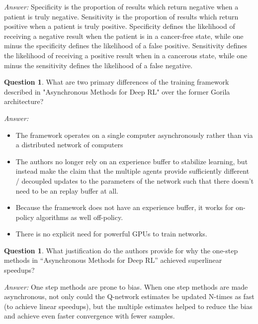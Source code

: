 \documentclass{article}
\theoremstyle{definition}
\newtheorem{question}[thm]{Question}
\newenvironment{answer}{\noindent\textit{Answer:}}{}
\begin{document}
\begin{answer}
Specificity is the proportion of results which return negative when a patient is truly negative. Sensitivity is the proportion of results which return positive when a patient is truly positive. Specificity defines the likelihood of receiving a negative result when the patient is in a cancer-free state, while one minus the specificity defines the likelihood of a false positive. Sensitivity defines the likelihood of receiving a positive result when in a cancerous state, while one minus the sensitivity defines the likelihood of a false negative.
\end{answer}

\begin{question}
What are two primary differences of the training framework described in "Asynchronous Methods for Deep RL" over the former Gorila architecture?
\end{question}

\begin{answer}
    \begin{itemize}
        \item The framework operates on a single computer asynchronously rather than via a distributed network of computers
        \item The authors no longer rely on an experience buffer to stabilize learning, but instead make the claim that the multiple agents provide sufficiently different / decoupled updates to the parameters of the network such that there doesn’t need to be an replay buffer at all.
        \item Because the framework does not have an experience buffer, it works for on-policy algorithms as well off-policy. 
        \item There is no explicit need for powerful GPUs to train networks. 
    \end{itemize}    
\end{answer}

\begin{question}
What justification do the authors provide for why the one-step methods in “Asynchronous Methods for Deep RL” achieved superlinear speedups? 
\end{question}

\begin{answer}
One step methods are prone to bias. When one step methods are made asynchronous, not only could the Q-network estimates be updated N-times as fast (to achieve linear speedups), but the multiple estimates helped to reduce the bias and achieve even faster convergence with fewer samples. 
\end{answer}
\end{document}
